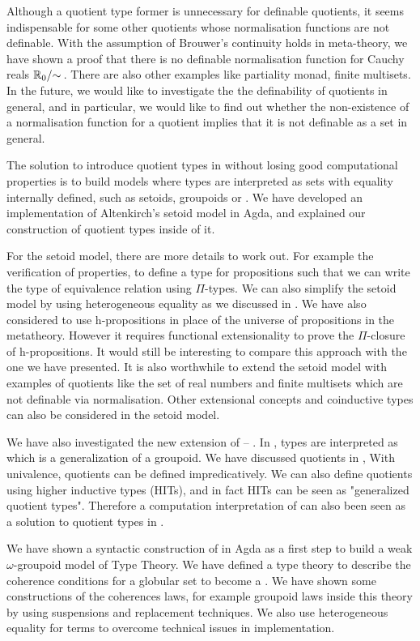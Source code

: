 Although a quotient type former is unnecessary for definable quotients, it seems indispensable for some other quotients whose normalisation functions are not definable. With the assumption of Brouwer's continuity holds in meta-theory, we have shown a proof that there is no definable normalisation function for Cauchy reals $\qset{\R_{0}}$. There are also other examples like partiality monad, finite multisets. 
In the future, we would like to investigate the the definability of quotients in general, and in particular, we would like to find out whether the non-existence of a normalisation function for a quotient implies that it is not definable as a set in general.


The solution to introduce quotient types in \itt without losing good computational properties is to build models where types are interpreted as sets with equality internally defined, such as setoids, groupoids or \wog. We have developed an implementation of Altenkirch's setoid model in Agda, and explained 
 our construction of quotient types inside of it.


For the setoid model, there are more details to work out. For example the verification of properties, to define a type for propositions such that we can write the type of equivalence relation using $\Pi$-types. We can also simplify the setoid model by using heterogeneous equality as we discussed in . We have also considered to use h-propositions in place of the universe of propositions in the metatheory. However it requires functional extensionality to prove the $\Pi$-closure of h-propositions. It would still be interesting to compare this approach with the one we have presented. It is also worthwhile to extend the setoid model with examples of quotients like the set of real numbers and finite multisets which are not definable via normalisation. 
Other extensional concepts and coinductive types can also be considered in the setoid model.


We have also investigated the new extension of \mltt --  \hott. In \hott, types are interpreted as \wog which is a generalization of a groupoid. We have discussed quotients in \hott, With univalence, quotients can be defined impredicatively. We can also define quotients using higher inductive types (HITs), and in fact HITs can be seen as "generalized quotient types".
Therefore a computation interpretation of \hott can also been seen as a solution to quotient types in \itt. 

We have shown a syntactic construction of \wog in Agda as a first step to build a weak $\omega$-groupoid model of Type Theory. We have defined a type theory \tig to describe the coherence conditions for a globular set to become a \wogs. We have shown some constructions of the coherences laws, for example groupoid laws inside this theory by using suspensions and replacement techniques. We also use heterogeneous equality for terms to overcome technical issues in implementation.

